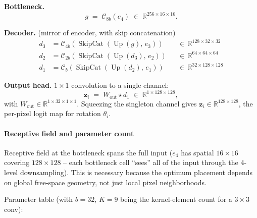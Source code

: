 \documentclass[11pt]{article}
\begin{document}
\textbf{Bottleneck.}
\[
  g \;=\; \mathcal{C}_{8b}(e_4) \;\in\;\mathbb{R}^{256\times16\times16}.
\]

\textbf{Decoder.} (mirror of encoder, with skip concatenation)
\[
\begin{aligned}
d_3 &= \mathcal{C}_{4b}\!\left(\operatorname{SkipCat}(\operatorname{Up}(g),\,e_3)\right)   && \in\,\mathbb{R}^{128\times32\times32}\\
d_2 &= \mathcal{C}_{2b}\!\left(\operatorname{SkipCat}(\operatorname{Up}(d_3),\,e_2)\right) && \in\,\mathbb{R}^{64\times64\times64}\\
d_1 &= \mathcal{C}_{b}\!\left(\operatorname{SkipCat}(\operatorname{Up}(d_2),\,e_1)\right)  && \in\,\mathbb{R}^{32\times128\times128}
\end{aligned}
\]

\textbf{Output head.}  $1{\times}1$ convolution to a single channel:
\[
  \mathbf{z}_i \;=\; W_{\text{out}} \star d_1 \;\in\; \mathbb{R}^{1\times128\times128},
\]
with $W_{\text{out}} \in \mathbb{R}^{1\times32\times1\times1}$.  Squeezing the singleton channel gives $\mathbf{z}_i \in \mathbb{R}^{128\times128}$, the per-pixel logit map for rotation $\theta_i$.

\paragraph{Receptive field and parameter count}
Receptive field at the bottleneck spans the full input ($e_4$ has spatial $16{\times}16$ covering $128{\times}128$ -- each bottleneck cell ``sees'' all of the input through the 4-level downsampling). This is necessary because the optimum placement depends on global free-space geometry, not just local pixel neighborhoods.

Parameter table (with $b = 32$, $K = 9$ being the kernel-element count for a $3{\times}3$ conv):
\end{document}
